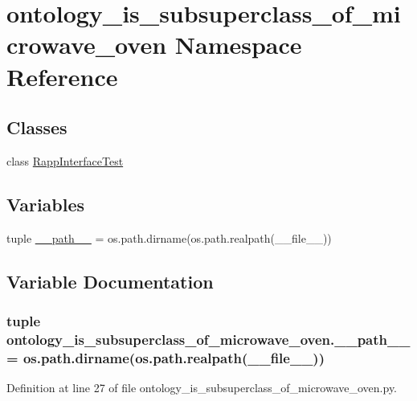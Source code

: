 \hypertarget{namespaceontology__is__subsuperclass__of__microwave__oven}{\section{ontology\-\_\-is\-\_\-subsuperclass\-\_\-of\-\_\-microwave\-\_\-oven Namespace Reference}
\label{namespaceontology__is__subsuperclass__of__microwave__oven}
}
\subsection*{Classes}
\begin{DoxyCompactItemize}
\item 
class \hyperlink{classontology__is__subsuperclass__of__microwave__oven_1_1RappInterfaceTest}{Rapp\-Interface\-Test}
\end{DoxyCompactItemize}
\subsection*{Variables}
\begin{DoxyCompactItemize}
\item 
tuple \hyperlink{namespaceontology__is__subsuperclass__of__microwave__oven_ab56297448c1f5f167c7fe10538c03b9c}{\-\_\-\-\_\-path\-\_\-\-\_\-} = os.\-path.\-dirname(os.\-path.\-realpath(\-\_\-\-\_\-file\-\_\-\-\_\-))
\end{DoxyCompactItemize}


\subsection{Variable Documentation}
\hypertarget{namespaceontology__is__subsuperclass__of__microwave__oven_ab56297448c1f5f167c7fe10538c03b9c}{
\subsubsection[{\-\_\-\-\_\-path\-\_\-\-\_\-}]{\setlength{\rightskip}{0pt plus 5cm}tuple ontology\-\_\-is\-\_\-subsuperclass\-\_\-of\-\_\-microwave\-\_\-oven.\-\_\-\-\_\-path\-\_\-\-\_\- = os.\-path.\-dirname(os.\-path.\-realpath(\-\_\-\-\_\-file\-\_\-\-\_\-))}}\label{namespaceontology__is__subsuperclass__of__microwave__oven_ab56297448c1f5f167c7fe10538c03b9c}


Definition at line 27 of file ontology\-\_\-is\-\_\-subsuperclass\-\_\-of\-\_\-microwave\-\_\-oven.\-py.


